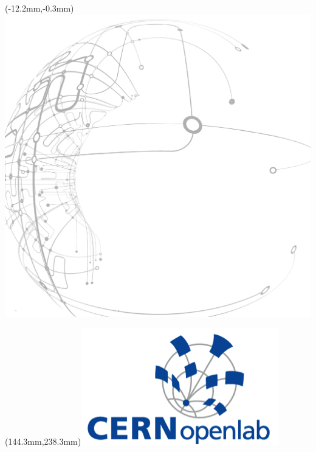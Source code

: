 \documentclass[12pt, letterpaper, pdflatex, leqno]{report}
\begin{document}
\begin{textblock*}{0mm}(-12.2mm,-0.3mm)\noindent \includegraphics*{./gfx/bg.png}\end{textblock*}
\begin{textblock*}{0mm}(144.3mm,238.3mm)\noindent \includegraphics*{./gfx/openlab.png}\end{textblock*}

\lipsum[1-50]
\end{document}
